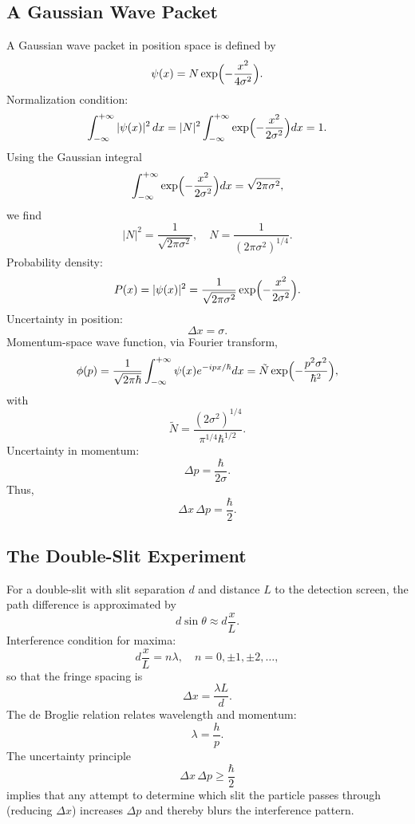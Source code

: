 \documentclass[twocolumn]{article}
\begin{document}
\begin{spacing}{1}
\subsection{A Gaussian Wave Packet}
A Gaussian wave packet in position space is defined by
\[
\psi(x)=N\exp\Bigl(-\frac{x^2}{4\sigma^2}\Bigr).
\]
Normalization condition:
\[
\int_{-\infty}^{+\infty}|\psi(x)|^2\,dx = |N|^2\int_{-\infty}^{+\infty}\exp\Bigl(-\frac{x^2}{2\sigma^2}\Bigr)dx = 1.
\]
Using the Gaussian integral
\[
\int_{-\infty}^{+\infty}\exp\Bigl(-\frac{x^2}{2\sigma^2}\Bigr)dx = \sqrt{2\pi\sigma^2},
\]
we find
\[
|N|^2 = \frac{1}{\sqrt{2\pi\sigma^2}},\quad N=\frac{1}{(2\pi\sigma^2)^{1/4}}.
\]
Probability density:
\[
P(x)=|\psi(x)|^2 = \frac{1}{\sqrt{2\pi\sigma^2}}\exp\Bigl(-\frac{x^2}{2\sigma^2}\Bigr).
\]
Uncertainty in position:
\[
\Delta x = \sigma.
\]
Momentum-space wave function, via Fourier transform,
\[
\phi(p)=\frac{1}{\sqrt{2\pi\hbar}}\int_{-\infty}^{+\infty}\psi(x)e^{-ipx/\hbar}dx = \tilde{N}\exp\Bigl(-\frac{p^2\sigma^2}{\hbar^2}\Bigr),
\]
with
\[
\tilde{N}=\frac{(2\sigma^2)^{1/4}}{\pi^{1/4}\hbar^{1/2}}.
\]
Uncertainty in momentum:
\[
\Delta p = \frac{\hbar}{2\sigma}.
\]
Thus,
\[
\Delta x\,\Delta p = \frac{\hbar}{2}.
\]

\subsection{The Double-Slit Experiment}
For a double-slit with slit separation \(d\) and distance \(L\) to the detection screen, the path difference is approximated by
\[
d\sin\theta\approx d\frac{x}{L}.
\]
Interference condition for maxima:
\[
d\frac{x}{L} = n\lambda,\quad n=0,\pm1,\pm2,\dots,
\]
so that the fringe spacing is
\[
\Delta x = \frac{\lambda L}{d}.
\]
The de Broglie relation relates wavelength and momentum:
\[
\lambda=\frac{h}{p}.
\]
The uncertainty principle
\[
\Delta x\,\Delta p\ge\frac{\hbar}{2}
\]
implies that any attempt to determine which slit the particle passes through (reducing \(\Delta x\)) increases \(\Delta p\) and thereby blurs the interference pattern.


\end{spacing}
\end{document}
